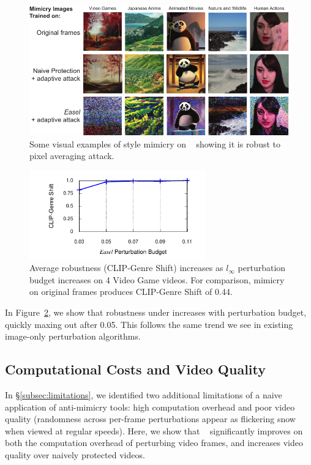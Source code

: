 \begin{figure}[t]
    \centering
    \includegraphics[width=0.95\columnwidth]{plots/core-style-mimicry-results-eps-converted-to.pdf}
    \vspace{-0.1in}
    \caption{Some visual examples of style mimicry on \system~ showing it is
      robust to pixel averaging attack.}
    \label{fig:core-style-mimicry-results}
    \vspace{-0.1in}    
  \end{figure}
\begin{figure}[t]
    \centering
    \includegraphics[width=3in]{plots/eval/eps-robustness-eps-converted-to.pdf}
    \vspace{-0.2in}
    \caption{Average robustness (CLIP-Genre Shift) increases as $l_{\infty}$
      perturbation budget increases on 4 Video Game videos. For comparison,
      mimicry on original frames produces CLIP-Genre Shift of 0.44.}
    \label{fig:eps-robustness}
\end{figure}

In Figure~\ref{fig:eps-robustness}, we show that robustness under \system{}
increases with perturbation budget, quickly maxing out after 0.05. This
follows the same trend we see in existing image-only perturbation algorithms. 


\subsection{Computational Costs and Video Quality}
\label{subsec:protection-usability}
In \S\ref{subsec:limitations}, we identified two additional limitations
of a naive application of anti-mimicry tools: high computation overhead and
poor video quality (randomness across per-frame perturbations appear as
flickering snow when viewed at regular speeds). Here, we show that
\system~ significantly improves on both the computation overhead of
perturbing video frames, and increases video quality over naively protected
videos.

